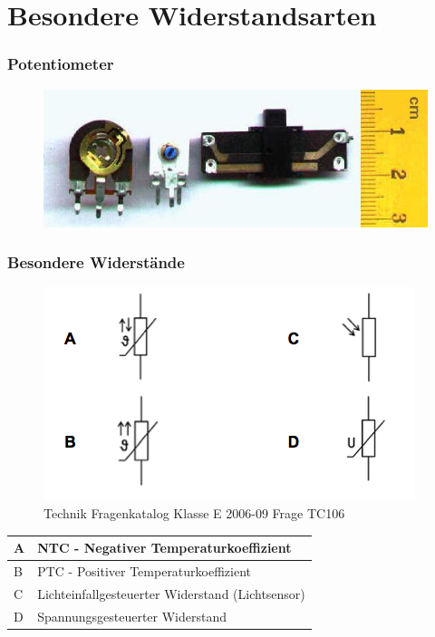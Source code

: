 \section*{Besondere Widerstandsarten}
\begin{frame}
  \frametitle{Potentiometer}

  \begin{center}
    \begin{figure}
      \includegraphics[width=\textwidth,height=.75\textheight,keepaspectratio]{e04/Potenziometer.jpg}
    \end{figure}
  \end{center}

\end{frame}

\begin{frame}
  \frametitle{Besondere Widerstände}

  \begin{center}
    \begin{figure}
      \includegraphics[width=.6\textwidth,height=.5\textheight,keepaspectratio]{e04/bild-TC106.png}
      \caption{Technik Fragenkatalog Klasse E 2006-09 Frage TC106}
    \end{figure}

    \begin{tabular}{l||l}\hline
      A & NTC - Negativer Temperaturkoeffizient \\ \hline
      B & PTC - Positiver Temperaturkoeffizient \\ \hline
      C & Lichteinfallgesteuerter Widerstand (Lichtsensor) \\ \hline
      D & Spannungsgesteuerter Widerstand \\ \hline
    \end{tabular}
  \end{center}
\end{frame}


